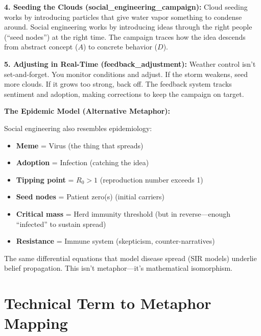 \documentclass[11pt,twoside]{book}
\theoremstyle{definition}
\theoremstyle{plain}
\theoremstyle{remark}
\begin{document}
\begin{tcolorbox}[colback=green!5!white,colframe=green!65!black,title=\textbf{Plain English: The Social Weather System},breakable]
\textbf{4. Seeding the Clouds (social\_engineering\_campaign):}
Cloud seeding works by introducing particles that give water vapor something to condense around. Social engineering works by introducing ideas through the right people (``seed nodes'') at the right time. The campaign traces how the idea descends from abstract concept ($A$) to concrete behavior ($D$).

\textbf{5. Adjusting in Real-Time (feedback\_adjustment):}
Weather control isn't set-and-forget. You monitor conditions and adjust. If the storm weakens, seed more clouds. If it grows too strong, back off. The feedback system tracks sentiment and adoption, making corrections to keep the campaign on target.

\textbf{The Epidemic Model (Alternative Metaphor):}

Social engineering also resembles epidemiology:
\begin{itemize}
    \item \textbf{Meme} = Virus (the thing that spreads)
    \item \textbf{Adoption} = Infection (catching the idea)
    \item \textbf{Tipping point} = $R_0 > 1$ (reproduction number exceeds 1)
    \item \textbf{Seed nodes} = Patient zero(s) (initial carriers)
    \item \textbf{Critical mass} = Herd immunity threshold (but in reverse---enough ``infected'' to sustain spread)
    \item \textbf{Resistance} = Immune system (skepticism, counter-narratives)
\end{itemize}

The same differential equations that model disease spread (SIR models) underlie belief propagation. This isn't metaphor---it's mathematical isomorphism.

\end{tcolorbox}

\chapter{Technical Term to Metaphor Mapping}
\end{document}
